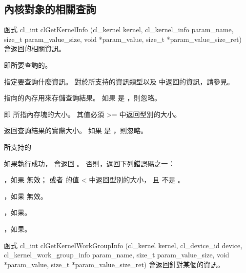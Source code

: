 \subsection{內核對象的相關查詢}

函式
\startclc
cl_int clGetKernelInfo (cl_kernel kernel,
			cl_kernel_info param_name,
			size_t param_value_size,
			void *param_value,
			size_t *param_value_size_ret)
\stopclc
會返回的相關資訊。

 即所要查詢的。

 指定要查詢什麼資訊。
對於所支持的資訊類型以及  中返回的資訊，請參見。

 指向的內存用來存儲查詢結果。
如果  是 ，則忽略。

 即  所指內存塊的大小。
其值必須 >= 中返回型別的大小。

 返回查詢結果的實際大小。
如果  是 ，則忽略。

\startbuffer[tblclGetKernelInfo]
 所支持的 
\stopbuffer
{}
{}

如果執行成功，  會返回 。
否則，返回下列錯誤碼之一：
\startigBase
\item {}，如果  無效；
或者  的值 < 中返回型別的大小，
且  不是 。

\item {}，如果  無效。

\item {}，如果\scdevfailres。

\item {}，如果\schostfailres。
\stopigBase

函式
\startclc
cl_int clGetKernelWorkGroupInfo (cl_kernel kernel,
			cl_device_id device,
			cl_kernel_work_group_info param_name,
			size_t param_value_size,
			void *param_value,
			size_t *param_value_size_ret)
\stopclc
會返回針對某個的資訊。

